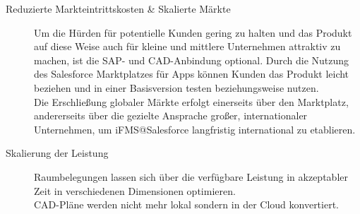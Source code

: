 \begin{description}
	\item[Reduzierte Markteintrittskosten \& Skalierte Märkte] Um die 
Hürden für potentielle Kunden gering zu halten und das Produkt auf diese Weise 
auch für kleine und mittlere Unternehmen attraktiv zu machen, ist die 
SAP- und CAD-Anbindung optional. Durch die Nutzung des Salesforce Marktplatzes 
für Apps können Kunden das Produkt leicht beziehen und in einer Basisversion 
testen beziehungsweise nutzen. \\
Die Erschließung globaler Märkte erfolgt einerseits über den Marktplatz, 
andererseits über die gezielte Ansprache großer, internationaler Unternehmen, 
um iFMS@Salesforce langfristig international zu etablieren.

	\item[Skalierung der Leistung] Raumbelegungen lassen sich über die 
verfügbare Leistung in akzeptabler Zeit in verschiedenen 
Dimensionen optimieren. \\
CAD-Pläne werden nicht mehr lokal sondern in der Cloud 
konvertiert.


\end{description}
